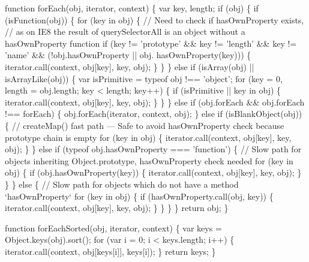 \begin{DoxyCodeInclude}
\textcolor{keyword}{function} forEach(obj, iterator, context) \{
  var key, length;
  \textcolor{keywordflow}{if} (obj) \{
    \textcolor{keywordflow}{if} (isFunction(obj)) \{
      \textcolor{keywordflow}{for} (key in obj) \{
        \textcolor{comment}{// Need to check if hasOwnProperty exists,}
        \textcolor{comment}{// as on IE8 the result of querySelectorAll is an object without a hasOwnProperty function}
        \textcolor{keywordflow}{if} (key != \textcolor{stringliteral}{'prototype'} && key != \textcolor{stringliteral}{'length'} && key != \textcolor{stringliteral}{'name'} && (!obj.hasOwnProperty || obj.
      hasOwnProperty(key))) \{
          iterator.call(context, obj[key], key, obj);
        \}
      \}
    \} \textcolor{keywordflow}{else} \textcolor{keywordflow}{if} (isArray(obj) || isArrayLike(obj)) \{
      var isPrimitive = typeof obj !== \textcolor{stringliteral}{'object'};
      \textcolor{keywordflow}{for} (key = 0, length = obj.length; key < length; key++) \{
        \textcolor{keywordflow}{if} (isPrimitive || key in obj) \{
          iterator.call(context, obj[key], key, obj);
        \}
      \}
    \} \textcolor{keywordflow}{else} \textcolor{keywordflow}{if} (obj.forEach && obj.forEach !== forEach) \{
        obj.forEach(iterator, context, obj);
    \} \textcolor{keywordflow}{else} \textcolor{keywordflow}{if} (isBlankObject(obj)) \{
      \textcolor{comment}{// createMap() fast path --- Safe to avoid hasOwnProperty check because prototype chain is empty}
      \textcolor{keywordflow}{for} (key in obj) \{
        iterator.call(context, obj[key], key, obj);
      \}
    \} \textcolor{keywordflow}{else} \textcolor{keywordflow}{if} (typeof obj.hasOwnProperty === \textcolor{stringliteral}{'function'}) \{
      \textcolor{comment}{// Slow path for objects inheriting Object.prototype, hasOwnProperty check needed}
      \textcolor{keywordflow}{for} (key in obj) \{
        \textcolor{keywordflow}{if} (obj.hasOwnProperty(key)) \{
          iterator.call(context, obj[key], key, obj);
        \}
      \}
    \} \textcolor{keywordflow}{else} \{
      \textcolor{comment}{// Slow path for objects which do not have a method `hasOwnProperty`}
      \textcolor{keywordflow}{for} (key in obj) \{
        \textcolor{keywordflow}{if} (hasOwnProperty.call(obj, key)) \{
          iterator.call(context, obj[key], key, obj);
        \}
      \}
    \}
  \}
  \textcolor{keywordflow}{return} obj;
\}

\textcolor{keyword}{function} forEachSorted(obj, iterator, context) \{
  var keys = Object.keys(obj).sort();
  \textcolor{keywordflow}{for} (var i = 0; i < keys.length; i++) \{
    iterator.call(context, obj[keys[i]], keys[i]);
  \}
  \textcolor{keywordflow}{return} keys;
\}



\end{DoxyCodeInclude}
